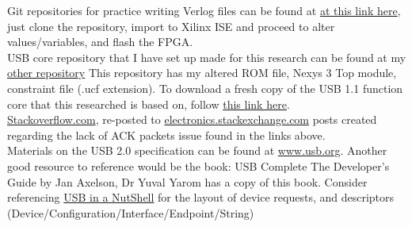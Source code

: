 \documentclass[10pt,a4paper]{article}
\begin{document}
Git repositories for practice writing Verlog files can be found at \href{https://github.com/JammyJims/Verilog_Cores.git}{at this link here}, just clone the repository, import to Xilinx ISE and proceed to alter values/variables, and flash the FPGA.\\

USB core repository that I have set up made for this research can be found at my  \href{https://github.com/JammyJims/USB_Research.git}{other repository} This repository has my altered ROM file, Nexys 3 Top module, constraint file (.ucf extension). To download a fresh copy of the USB 1.1 function core that this researched is based on, follow \href{https://github.com/freecores/usb1_funct.git}{this link here}.\\

\href {https://stackoverflow.com/posts/48738506/edit}{Stackoverflow.com}, re-posted to \href {https://electronics.stackexchange.com/questions/355777/lack-of-ack-packets-appears-to-cause-custom-usb-core-to-not-work}{electronics.stackexchange.com} posts created regarding the lack of ACK packets issue found in the links above.\\

Materials on the USB 2.0 specification can be found at \href{http://www.usb.org/developers/docs/usb20_docs/}{www.usb.org}. Another good resource to reference would be the book: USB Complete The Developer's Guide by Jan Axelson, Dr Yuval Yarom has a copy of this book. Consider referencing \href {http://www.beyondlogic.org/usbnutshell/usb1.shtml}{USB in a NutShell} for the layout of device requests, and descriptors (Device/Configuration/Interface/Endpoint/String) 
\end{document}
